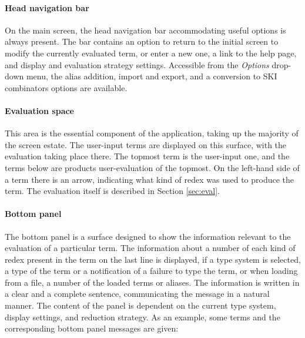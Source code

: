 \documentclass[table, a4paper, 10pt]{article}
\begin{document}
\paragraph{Head navigation bar}
On the main screen, the head navigation bar accommodating useful options is always present.
The bar contains an option to return to the initial screen to modify the currently evaluated term,
or enter a new one, a link to the help page, and display and evaluation strategy settings.
Accessible from the \textit{Options} drop-down menu, the alias addition, import and export, and
a conversion to SKI combinators options are available.

\paragraph{Evaluation space}
This area is the essential component of the application, taking up the majority
of the screen estate. The user-input terms are displayed on this surface, with the
evaluation taking place there. The topmost term is the user-input one,
and the terms below are products user-evaluation of the topmost. On the left-hand
side of a term there is an arrow, indicating what kind of redex was used to produce
the term. The evaluation itself is described in Section \ref{sec:eval}.

\paragraph{Bottom panel} The bottom panel is a surface designed to show the information
relevant to the evaluation of a particular term. The information about
a number of each kind of redex present in the term on the last line is displayed,
if a type system is selected, a type of the term or a notification
of a failure to type the term, or when loading from a file,
a number of the loaded terms or aliases. The information is written in a clear and
a complete sentence, communicating the message in a natural manner.
The content of the panel is dependent on the current type system, display settings, and reduction strategy.
As an example, some terms and the corresponding bottom panel messages are given:
\begin{framed}
\end{framed}
\end{document}
